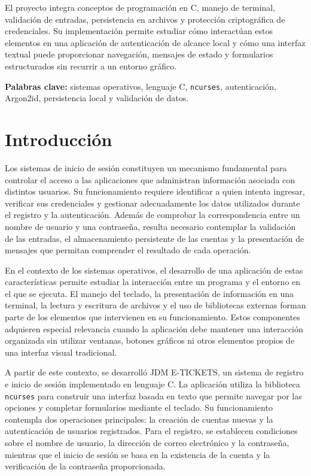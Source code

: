 \documentclass[11pt, letterpaper]{article}
\begin{document}
El proyecto integra conceptos de programación en C, manejo de terminal, validación de entradas, persistencia en archivos y protección criptográfica de credenciales.
Su implementación permite estudiar cómo interactúan estos elementos en una aplicación de autenticación de alcance local y cómo una interfaz textual puede proporcionar navegación, mensajes de estado y formularios estructurados sin recurrir a un entorno gráfico.

\noindent\textbf{Palabras clave:} sistemas operativos, lenguaje C, \texttt{ncurses}, autenticación, Argon2id, persistencia local y validación de datos.

\newpage

\tableofcontents

\newpage

\section{Introducción}
Los sistemas de inicio de sesión constituyen un mecanismo fundamental para controlar el acceso a las aplicaciones que administran información asociada con distintos usuarios.
Su funcionamiento requiere identificar a quien intenta ingresar, verificar sus credenciales y gestionar adecuadamente los datos utilizados durante el registro y la autenticación.
Además de comprobar la correspondencia entre un nombre de usuario y una contraseña, resulta necesario contemplar la validación de las entradas, el almacenamiento persistente de las cuentas y la presentación de mensajes que permitan comprender el resultado de cada operación.

En el contexto de los sistemas operativos, el desarrollo de una aplicación de estas características permite estudiar la interacción entre un programa y el entorno en el que se ejecuta.
El manejo del teclado, la presentación de información en una terminal, la lectura y escritura de archivos y el uso de bibliotecas externas forman parte de los elementos que intervienen en su funcionamiento.
Estos componentes adquieren especial relevancia cuando la aplicación debe mantener una interacción organizada sin utilizar ventanas, botones gráficos ni otros elementos propios de una interfaz visual tradicional.

A partir de este contexto, se desarrolló JDM E-TICKETS, un sistema de registro e inicio de sesión implementado en lenguaje C.
La aplicación utiliza la biblioteca \texttt{ncurses} para construir una interfaz basada en texto que permite navegar por las opciones y completar formularios mediante el teclado.
Su funcionamiento contempla dos operaciones principales: la creación de cuentas nuevas y la autenticación de usuarios registrados.
Para el registro, se establecen condiciones sobre el nombre de usuario, la dirección de correo electrónico y la contraseña, mientras que el inicio de sesión se basa en la existencia de la cuenta y la verificación de la contraseña proporcionada.
\end{document}
